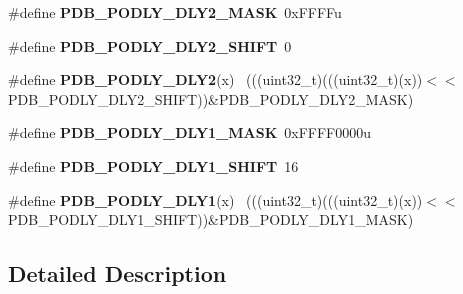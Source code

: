 \begin{DoxyCompactItemize}
\item 
\hypertarget{group___p_d_b___register___masks_ga1b7c6a0b290ea82908b74e7b8c2f4009}{}\#define {\bfseries P\+D\+B\+\_\+\+P\+O\+D\+L\+Y\+\_\+\+D\+L\+Y2\+\_\+\+M\+A\+S\+K}~0x\+F\+F\+F\+Fu\label{group___p_d_b___register___masks_ga1b7c6a0b290ea82908b74e7b8c2f4009}

\item 
\hypertarget{group___p_d_b___register___masks_gaa576ed647be6411616c3f6e6d03ab47c}{}\#define {\bfseries P\+D\+B\+\_\+\+P\+O\+D\+L\+Y\+\_\+\+D\+L\+Y2\+\_\+\+S\+H\+I\+F\+T}~0\label{group___p_d_b___register___masks_gaa576ed647be6411616c3f6e6d03ab47c}

\item 
\hypertarget{group___p_d_b___register___masks_gacb978b29977f07b658a43d8591505f74}{}\#define {\bfseries P\+D\+B\+\_\+\+P\+O\+D\+L\+Y\+\_\+\+D\+L\+Y2}(x)                                            ~(((uint32\+\_\+t)(((uint32\+\_\+t)(x))$<$$<$P\+D\+B\+\_\+\+P\+O\+D\+L\+Y\+\_\+\+D\+L\+Y2\+\_\+\+S\+H\+I\+F\+T))\&P\+D\+B\+\_\+\+P\+O\+D\+L\+Y\+\_\+\+D\+L\+Y2\+\_\+\+M\+A\+S\+K)\label{group___p_d_b___register___masks_gacb978b29977f07b658a43d8591505f74}

\item 
\hypertarget{group___p_d_b___register___masks_ga548246bef07975bd6f1fe0fe5a2c6ef5}{}\#define {\bfseries P\+D\+B\+\_\+\+P\+O\+D\+L\+Y\+\_\+\+D\+L\+Y1\+\_\+\+M\+A\+S\+K}~0x\+F\+F\+F\+F0000u\label{group___p_d_b___register___masks_ga548246bef07975bd6f1fe0fe5a2c6ef5}

\item 
\hypertarget{group___p_d_b___register___masks_ga0890f882369124f86428eea14c2eac88}{}\#define {\bfseries P\+D\+B\+\_\+\+P\+O\+D\+L\+Y\+\_\+\+D\+L\+Y1\+\_\+\+S\+H\+I\+F\+T}~16\label{group___p_d_b___register___masks_ga0890f882369124f86428eea14c2eac88}

\item 
\hypertarget{group___p_d_b___register___masks_ga5fe71745774ba14545ef51561393fb3b}{}\#define {\bfseries P\+D\+B\+\_\+\+P\+O\+D\+L\+Y\+\_\+\+D\+L\+Y1}(x)                                            ~(((uint32\+\_\+t)(((uint32\+\_\+t)(x))$<$$<$P\+D\+B\+\_\+\+P\+O\+D\+L\+Y\+\_\+\+D\+L\+Y1\+\_\+\+S\+H\+I\+F\+T))\&P\+D\+B\+\_\+\+P\+O\+D\+L\+Y\+\_\+\+D\+L\+Y1\+\_\+\+M\+A\+S\+K)\label{group___p_d_b___register___masks_ga5fe71745774ba14545ef51561393fb3b}

\end{DoxyCompactItemize}


\subsection{Detailed Description}
